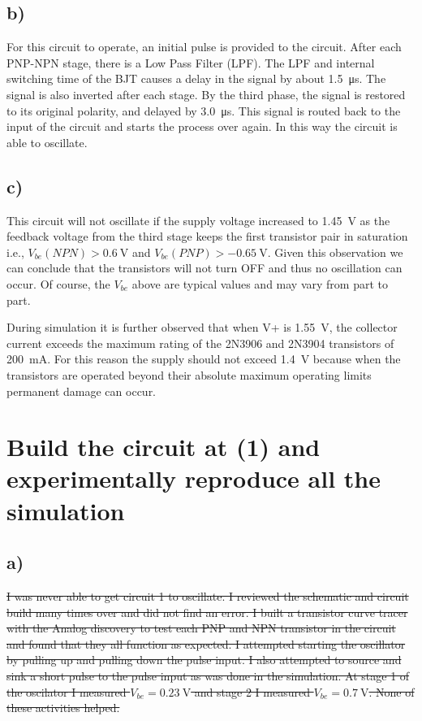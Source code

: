 \documentclass{article}
\begin{document}
	\subsection*{b)}
	For this circuit to operate, an initial pulse is provided to the circuit. After each PNP-NPN stage, there is a Low Pass Filter (LPF). The LPF and internal switching time of the BJT causes a delay in the signal by about \SI{1.5}{\us}. The signal is also inverted after each stage. By the third phase, the signal is restored to its original polarity, and delayed by \SI{3.0}{\us}. This signal is routed back to the input of the circuit and starts the process over again. In this way the circuit is able to oscillate.
	
	\subsection*{c)}
	
	This circuit will not oscillate if the supply voltage increased to \SI{1.45}{\volt} as the feedback voltage from the third stage keeps the first transistor pair in saturation i.e., $V_{be}(NPN) > \SI{0.6}{\volt}$ and $V_{be}(PNP) > \SI{-0.65}{\volt}$. Given this observation we can conclude that the transistors will not turn OFF and thus no oscillation can occur. Of course, the $V_{be}$ above are typical values and may vary from part to part.
	
	During simulation it is further observed that when V+ is \SI{1.55}{\volt}, the collector current exceeds the maximum rating of the 2N3906 and 2N3904 transistors of \SI{200}{\mA}. For this reason the supply should not exceed \SI{1.4}{\volt} because when the transistors are operated beyond their absolute maximum operating limits permanent damage can occur.
	
	\section{Build the circuit at (1) and experimentally reproduce all the simulation}
	
	\subsection*{a)}
	
	\sout{I was never able to get circuit 1 to oscillate. I reviewed the schematic and circuit build many times over and did not find an error. I built a transistor curve tracer with the Analog discovery to test each PNP and NPN transistor in the circuit and found that they all function as expected. I attempted starting the oscillator by pulling up and pulling down the pulse input. I also attempted to source and sink a short pulse to the pulse input as was done in the simulation. At stage 1 of the oscilator I measured $V_{be} = \SI{0.23}{\volt}$ and stage 2 I measured  $V_{be} = \SI{0.7}{\volt}$. None of these activities helped. }
	
\end{document}
